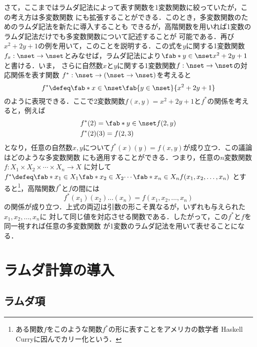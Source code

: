 \documentclass[uplatex,dvipdfmx,report,fleqn]{jsbook}
\begin{document}
さて，ここまではラムダ記法によって表す関数を1変数関数に絞っていたが，この考え方は多変数関数
にも拡張することができる．このとき，多変数関数のためのラムダ記法を新たに導入することも
できるが，高階関数を用いれば1変数のラムダ記法だけでも多変数関数について記述することが
可能である．再び$x^2+2y+1$の例を用いて，このことを説明する．この式を$y$に関する1変数関数
$f_x:\nset\to\nset$とみなせば，ラムダ記法により$\fab*{y\in\nset}{x^2+2y+1}$と書ける．いま，
さらに自然数$x$と$y$に関する1変数関数$f:\nset\to\nset$の対応関係を表す関数
$f^*:\nset\to(\nset\to\nset)$を考えると
\[
f^* \defeq \fab*{x\in\nset}{\fab{y\in\nset}{x^2+2y+1}}
\]
のように表現できる．ここで2変数関数$f(x,y)=x^2+2y+1$と$f^*$の関係を考えると，例えば
%
\begin{align*}
&f^*(2) = \fab*{y\in\nset}{f(2,y)} \\
&f^*(2)(3) = f(2,3)
\end{align*}
%
となり，任意の自然数$x,y$について$f^*(x)(y)=f(x,y)$が成り立つ．この議論はどのような多変数関数
にも適用することができる．つまり，任意の$n$変数関数$f:X_1\times X_2\times\cdots\times X_n\to X$
に対して
$f^* \defeq \fab*{x_1\in X_1}{\fab*{x_2\in X_2}{\cdots\fab*{x_n\in X_n}{f(x_1,x_2,\dots,x_n)}}}$
とすると\footnote{ある関数$f$をこのような関数$f^*$の形に表すことをアメリカの数学者
Haskell Curryに因んでカリー化という．}，高階関数$f^*$と$f$の間には
\[
f^*(x_1)(x_2)\dots(x_n) = f(x_1,x_2,\dots,x_n)
\]
の関係が成り立つ．上式の両辺は引数の形こそ異なるが，いずれも与えられた$x_1,x_2,\dots,x_n$に
対して同じ値を対応させる関数である．したがって，この$f^*$と$f$を同一視すれば任意の多変数関数
が1変数のラムダ記法を用いて表せることになる．

\section{ラムダ計算の導入}

\subsection{ラムダ項}
\end{document}
